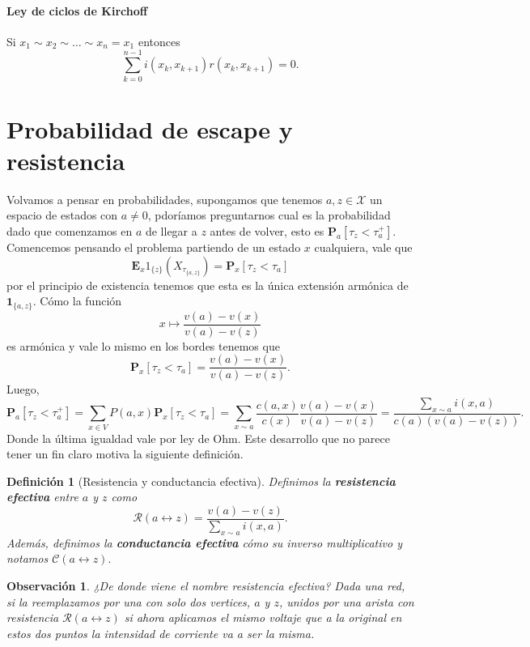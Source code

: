 \documentclass[11pt,a4paper]{article}
\newcommand{\Prob}{\textbf{P}}
\newcommand{\E}{\textbf{E}}
\newcommand{\ind}[1]{\mathbf{1}_{#1}}
\newcommand{\defn}[1]{\textbf{\emph{#1}}}
\numberwithin{equation}{section}
\theoremstyle{LPplain}
\theoremstyle{LPdef}
\newtheorem{defi}[teo]{Definición}
\theoremstyle{LPrem}
\newtheorem{obs}[teo]{Observación}
\begin{document}
\paragraph{Ley de ciclos de Kirchoff} Si $x_1 \sim x_2 \sim \dots \sim x_n = x_1$ entonces 
$$\sum_{k=0}^{n-1} i(x_k, x_{k+1})r(x_k, x_{k+1}) = 0.$$

\section{Probabilidad de escape y resistencia}

Volvamos a pensar en probabilidades, supongamos que tenemos $a, z \in \mathcal{X}$ un espacio
de estados con $a \neq 0$, pdoríamos preguntarnos cual es la probabilidad dado que comenzamos
en $a$ de llegar a $z$ antes de volver, esto es $\Prob_a[\tau_z < \tau_{a}^{+}]$. Comencemos 
pensando el problema partiendo de un estado $x$ cualquiera, vale que 
$$\E_x 1_{\{z\}}(X_{\tau_{\{a,z\}}}) = \Prob_x[\tau_z < \tau_{a}]$$
por el principio de existencia tenemos que esta es la única extensión armónica de 
$\ind{{\{a,z\}}}$. Cómo la función
$$ x \mapsto \frac{v(a) - v(x)}{v(a) - v(z)} $$
es armónica y vale lo mismo en los bordes tenemos que
$$ \Prob_x[\tau_z < \tau_{a}] = \frac{v(a) - v(x)}{v(a) - v(z)}.$$
Luego,
$$ 
\Prob_a[\tau_z < \tau_{a}^{+}] = \sum_{x \in V} P(a, x) \Prob_x[\tau_z < \tau_{a}] = 
\sum_{x \sim a} \frac{c(a, x)}{c(x)} \frac{v(a) - v(x)}{v(a) - v(z)} = \frac{\sum_{x \sim a} i(x, a)}{c(a) (v(a) - v(z))}.
$$
Donde la última igualdad vale por ley de Ohm. Este desarrollo que no parece tener un fin
claro motiva la siguiente definición.

\begin{defi}[Resistencia y conductancia efectiva]
  Definimos la \defn{resistencia efectiva} entre $a$ y $z$ como
  $$ \mathscr{R}(a \leftrightarrow z) = \frac{v(a) - v(z)}{\sum_{x \sim a} i(x, a)}.$$
  Además, definimos la \defn{conductancia efectiva} cómo su inverso multiplicativo y notamos
  $\mathscr{C}(a \leftrightarrow z).$
\end{defi}

\begin{obs}
  ¿De donde viene el nombre resistencia efectiva? Dada una red, si la reemplazamos
  por una con solo dos vertices, $a$ y $z$, unidos por una arista con resistencia 
  $\mathscr{R}(a \leftrightarrow z)$ si ahora aplicamos el mismo voltaje que a la original
  en estos dos puntos la intensidad de corriente va a ser la misma.
\end{obs}
\end{document}
